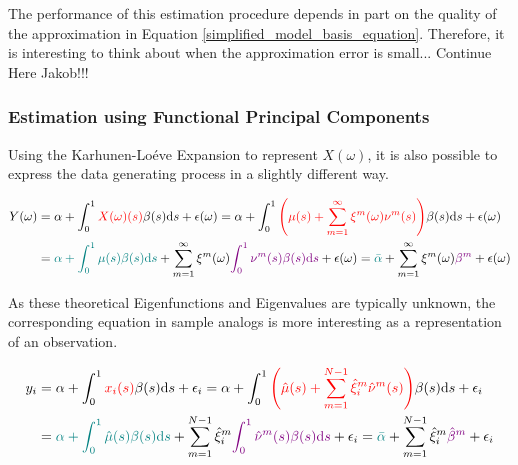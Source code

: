 \documentclass[11pt,twoside,a4paper]{article}
\begin{document}
	The performance of this estimation procedure depends in part on the quality of the approximation in Equation \ref{simplified_model_basis_equation}. Therefore, it is interesting to think about when the approximation error is small... {\color{red}Continue Here Jakob!!!}
	
	\subsubsection{Estimation using Functional Principal Components}\label{fpc_exp_transf}
	
	Using the Karhunen-Lo\'{e}ve Expansion to represent $X(\omega)$, it is also possible to express the data generating process in a slightly different way.
	
	\begin{equation}
		\begin{split}
			Y(\omega) &= \alpha + \int_{0}^{1} {\color{red}X(\omega)(s)} \beta(s) \mathrm{d}s + \epsilon(\omega)
			= \alpha + \int_{0}^{1} {\color{red}\left(\mu(s) + \sum_{m = 1}^{\infty} \xi^m(\omega) \nu^m(s)\right)} \beta(s) \mathrm{d}s + \epsilon(\omega)\\
			&= {\color{teal}\alpha + \int_{0}^{1} \mu(s) \beta(s) \mathrm{d}s} + \sum_{m = 1}^{\infty} \xi^m(\omega) {\color{violet}\int_{0}^{1} \nu^m(s) \beta(s) \mathrm{d}s} + \epsilon(\omega)
			= {\color{teal}\bar{\alpha}} + \sum_{m = 1}^{\infty} \xi^m(\omega) {\color{violet}\beta^m} + \epsilon(\omega)
		\end{split}
	\end{equation}

	As these theoretical Eigenfunctions and Eigenvalues are typically unknown, the corresponding equation in sample analogs is more interesting as a representation of an observation.
	
	\begin{equation}
		\begin{split}
			y_i &= \alpha + \int_{0}^{1} {\color{red}x_i(s)} \beta(s) \mathrm{d}s + \epsilon_i
			= \alpha + \int_{0}^{1} {\color{red}\left(\hat{\mu}(s) + \sum_{m = 1}^{N-1} \hat{\xi}^m_i \hat{\nu}^m(s)\right)} \beta(s) \mathrm{d}s + \epsilon_i\\
			&= {\color{teal}\alpha + \int_{0}^{1} \hat{\mu}(s) \beta(s) \mathrm{d}s} + \sum_{m = 1}^{N-1} \hat{\xi}^m_i {\color{violet}\int_{0}^{1} \hat{\nu}^m(s) \beta(s) \mathrm{d}s} + \epsilon_i
			= {\color{teal}\bar{\alpha}} + \sum_{m = 1}^{N-1} \hat{\xi}^m_i {\color{violet}\hat{\beta}^m} + \epsilon_i
		\end{split}
	\end{equation}
	
\end{document}
